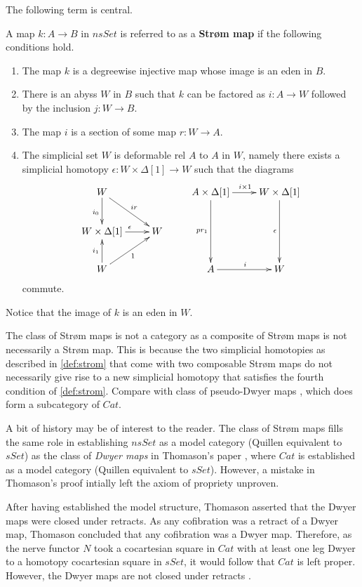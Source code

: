 The following term is central.
\begin{definition}\label{def:strom}
A map $k:A\to B$ in $nsSet$ is referred to as a \textbf{Strøm map} if the following conditions hold.
\begin{enumerate}
\item{The map $k$ is a degreewise injective map whose image is an eden in $B$.}
\item{There is an abyss $W$ in $B$ such that $k$ can be factored as $i:A\to W$ followed by the inclusion $j:W\to B$.}
\item{The map $i$ is a section of some map $r:W\to A$.}
\item{The simplicial set $W$ is deformable rel $A$ to $A$ in $W$, namely there exists a simplicial homotopy $\epsilon :W\times \Delta [1]\to W$ such that the diagrams
\begin{displaymath}
\xymatrix{
W \ar[d]_{i_0} \ar[dr]^{ir} && A\times \Delta [1] \ar[dd]_{pr_1} \ar[r]^{i\times1} & W\times \Delta [1] \ar[dd]_{\epsilon } \\
W\times \Delta [1] \ar[r]^\epsilon & W  \\
W \ar[u]^{i_1} \ar[ur]_1 && A \ar[r]^i & W
}
\end{displaymath}
commute.}
\end{enumerate}
\end{definition}
\noindent Notice that the image of $k$ is an eden in $W$.

The class of Str\o m maps is not a category as a composite of Str\o m maps is not necessarily a Str\o m map. This is because the two simplicial homotopies as described in \cref{def:strom} that come with two composable Str\o m maps do not necessarily give rise to a new simplicial homotopy that satisfies the fourth condition of \cref{def:strom}. Compare with class of pseudo-Dwyer maps \cite{Ci99}, which does form a subcategory of $Cat$.

A bit of history may be of interest to the reader. The class of Str\o m maps fills the same role in establishing $nsSet$ as a model category (Quillen equivalent to $sSet$) as the class of \emph{Dwyer maps} in Thomason's paper \cite{Th80}, where $Cat$ is established as a model category (Quillen equivalent to $sSet$). However, a mistake in Thomason's proof intially left the axiom of propriety unproven.

After having established the model structure, Thomason asserted that the Dwyer maps were closed under retracts. As any cofibration was a retract of a Dwyer map, Thomason concluded that any cofibration was a Dwyer map. Therefore, as the nerve functor $N$ took a cocartesian square in $Cat$ with at least one leg Dwyer to a homotopy cocartesian square in $sSet$, it would follow that $Cat$ is left proper. However, the Dwyer maps are not closed under retracts \cite{Ci99}.

